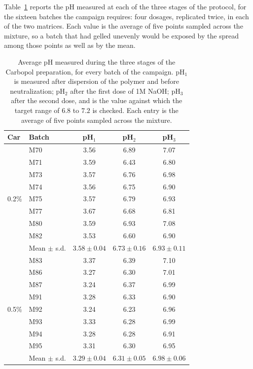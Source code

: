 \documentclass[%
  aip,
  pof,
  reprint,
  floatfix
]{revtex4-2}
\begin{document}
Table~\ref{tab:sup_ph} reports the pH measured at each of the three stages of the protocol, for the sixteen batches the campaign requires: four dosages, replicated twice, in each of the two matrices. Each value is the average of five points sampled across the mixture, so a batch that had gelled unevenly would be exposed by the spread among those points as well as by the mean.

\begin{table}[htb]
\centering
\caption{Average pH measured during the three stages of the Carbopol preparation, for every batch of the campaign. pH$_1$ is measured after dispersion of the polymer and before neutralization; pH$_2$ after the first dose of 1M NaOH; pH$_3$ after the second dose, and is the value against which the target range of $6.8$ to $7.2$ is checked. Each entry is the average of five points sampled across the mixture.}
\label{tab:sup_ph}
\begin{tabular}{l l c c c}
\toprule
\textbf{Car} & \textbf{Batch} & \textbf{pH$_1$} & \textbf{pH$_2$} & \textbf{pH$_3$} \\
\midrule
\multirow{9}{*}{0.2\%}
 & M70 & 3.56 & 6.89 & 7.07 \\
 & M71 & 3.59 & 6.43 & 6.80 \\
 & M73 & 3.57 & 6.76 & 6.98 \\
 & M74 & 3.56 & 6.75 & 6.90 \\
 & M75 & 3.57 & 6.79 & 6.93 \\
 & M77 & 3.67 & 6.68 & 6.81 \\
 & M80 & 3.59 & 6.93 & 7.08 \\
 & M82 & 3.53 & 6.60 & 6.90 \\
\cmidrule(lr){2-5}
 & Mean $\pm$ s.d. & $3.58\pm0.04$ & $6.73\pm0.16$ & $6.93\pm0.11$ \\
\midrule
\multirow{9}{*}{0.5\%}
 & M83 & 3.37 & 6.39 & 7.10 \\
 & M86 & 3.27 & 6.30 & 7.01 \\
 & M87 & 3.24 & 6.37 & 6.99 \\
 & M91 & 3.28 & 6.33 & 6.90 \\
 & M92 & 3.24 & 6.23 & 6.96 \\
 & M93 & 3.33 & 6.28 & 6.99 \\
 & M94 & 3.28 & 6.28 & 6.91 \\
 & M95 & 3.31 & 6.30 & 6.95 \\
\cmidrule(lr){2-5}
 & Mean $\pm$ s.d. & $3.29\pm0.04$ & $6.31\pm0.05$ & $6.98\pm0.06$ \\
\bottomrule
\end{tabular}
\end{table}
\end{document}
